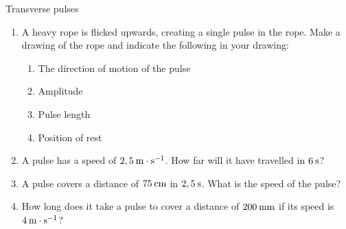 \begin{eocexercises}{Transverse pulses}
            \nopagebreak
      \label{m38802*id316647}\begin{enumerate}[noitemsep, label=\textbf{\arabic*}. ] 
            \label{m38802*uid66}\item A heavy rope is flicked upwards, creating a single pulse in the rope. Make a drawing of the rope and indicate the following in your drawing:
\label{m38802*id316663}\begin{enumerate}[noitemsep, label=\textbf{\alph*}. ] 
            \label{m38802*uid67}\item The direction of motion of the pulse
\label{m38802*uid68}\item Amplitude
\label{m38802*uid69}\item Pulse length
\label{m38802*uid70}\item Position of rest
\end{enumerate}
                \label{m38802*uid71}\item A pulse has a speed of $2,5\phantom{\rule{2pt}{0ex}}\text{m}\ensuremath{\cdot}\text{s}{}^{-1}$. How far will it have travelled in $6\phantom{\rule{2pt}{0ex}}\text{s}$?\newline
\label{m38802*uid72}\item A pulse covers a distance of $75\phantom{\rule{2pt}{0ex}}\text{cm}$ in $2,5\phantom{\rule{2pt}{0ex}}\text{s}$. What is the speed of the pulse?\newline
\label{m38802*uid73}\item How long does it take a pulse to cover a distance of $200\phantom{\rule{2pt}{0ex}}\text{mm}$ if its speed is $4\phantom{\rule{2pt}{0ex}}\text{m}\ensuremath{\cdot}\text{s}{}^{-1}$?\newline

\end{enumerate}
\end{eocexercises}

